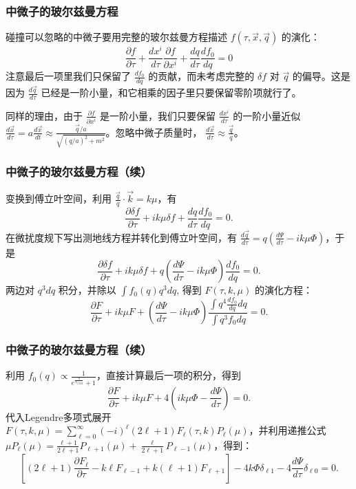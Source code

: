 \documentclass[CJK,13pt]{beamer}
\begin{document}
    
    \begin{frame}
      \frametitle{中微子的玻尔兹曼方程}
      碰撞可以忽略的中微子要用完整的玻尔兹曼方程描述 $f(\tau, \vec{x}, \vec{q})$ 的演化：
      $$\frac{\partial f}{\partial \tau} + \frac{dx^i}{d\tau}\frac{\partial f}{\partial x^i} + \frac{d q}{d\tau} \frac{d f_0}{d q} = 0$$
      注意最后一项里我们只保留了 $\frac{d f_0}{d q}$ 的贡献，而未考虑完整的 $\delta f$ 对 $\vec{q}$ 的偏导。这是因为 $\frac{d\vec{q}}{d\tau}$ 已经是一阶小量，和它相乘的因子里只要保留零阶项就行了。

      同样的理由，由于 $\frac{\partial f}{\partial x^i}$ 是一阶小量，我们只要保留 $\frac{dx^i}{d\tau}$ 的一阶小量近似 $\frac{d\vec{x}}{d\tau} = a \frac{d\vec{x}}{dt} \approx \frac{\vec{q}/a}{\sqrt{(q/a)^2+m^2}}$。忽略中微子质量时， $\frac{d\vec{x}}{d\tau}\approx \frac{\vec{q}}{q}$。

    \end{frame}

    \begin{frame}
      \frametitle{中微子的玻尔兹曼方程（续）}
      变换到傅立叶空间，利用 $\frac{\vec{q}}{q}\cdot\vec{k} = k\mu $，有
      $$\frac{\partial \delta f}{\partial \tau} + ik\mu \delta f + \frac{d q}{d\tau} \frac{d f_0}{d q} = 0.$$
      在微扰度规下写出测地线方程并转化到傅立叶空间，有 $ \frac{d\vec{q}}{d\tau} = q\left(\frac{d\Psi}{d\tau}-ik\mu\Phi\right)$，于是
      $$\frac{\partial \delta f}{\partial \tau} + ik\mu \delta f +  q\left(\frac{d\Psi}{d\tau}-ik\mu\Phi\right) \frac{d f_0}{d q} = 0.$$      
      两边对 $q^3dq$ 积分，并除以  $\int f_0(q)q^3dq$, 得到 $F(\tau, k, \mu)$ 的演化方程：
      $$\frac{\partial F}{\partial \tau} + ik\mu F + \left(\frac{d\Psi}{d\tau}-ik\mu\Phi\right) \frac{\int q^4\frac{d f_0}{d q}dq}{\int q^3f_0dq} = 0.$$      
    \end{frame}


    \begin{frame}
      \frametitle{中微子的玻尔兹曼方程（续）}
      利用 $f_0(q) \propto \frac{1}{e^{\frac{q}{T_{CNB}}}+1}$，直接计算最后一项的积分，得到
       $$\frac{\partial F}{\partial \tau} + ik\mu F + 4\left(ik\mu\Phi-\frac{d\Psi}{d\tau}\right) = 0.$$
      代入Legendre多项式展开 $ F(\tau,k,\mu) =  \sum_{\ell=0}^\infty (-i)^\ell (2\ell+1) F_\ell(\tau, k) P_\ell(\mu) $，并利用递推公式
      $\mu P_\ell(\mu) = \frac{\ell+1}{2\ell+1}P_{\ell +1}(\mu) + \frac{\ell}{2\ell+1}P_{\ell-1}(\mu)$，得到：
       $$ \left[(2\ell+1)\frac{\partial F_\ell}{\partial \tau} - k\ell F_{\ell-1} + k (\ell+1) F_{\ell+1}\right]   -  4 k\Phi \delta_{\ell 1} -4\frac{d\Psi}{d\tau}\delta_{\ell 0} = 0.$$
    \end{frame}
\end{document}
